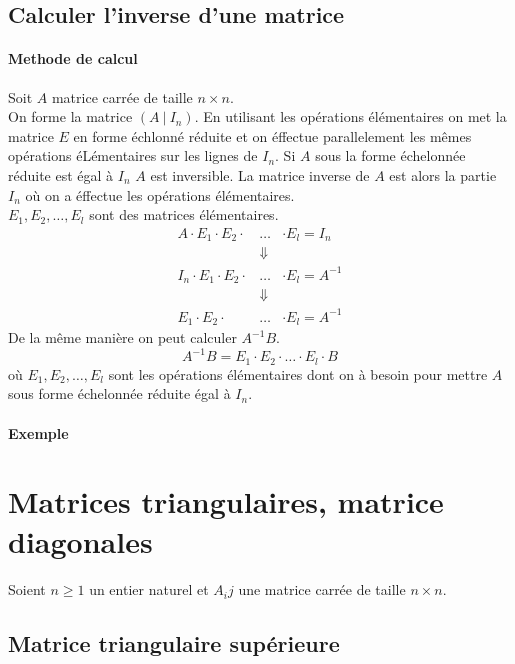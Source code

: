%
\subsection{Calculer l'inverse d'une matrice}
%
\paragraph{Methode de calcul} Soit $A$ matrice carrée de taille $n\times n$. \\
On forme la matrice $(A ~ \vert ~ I_n)$. En utilisant les opérations élémentaires on met la matrice $E$ en forme échlonné réduite et on éffectue parallelement les mêmes opérations éLémentaires sur les lignes de $I_n$. Si $A$ sous la forme échelonnée réduite est égal à $I_n$ $A$ est inversible. La matrice inverse de $A$ est alors la partie $I_n$ où on a éffectue les opérations élémentaires. \\
$E_1, E_2, \ldots, E_l$ sont des matrices élémentaires.
\begin{eqnarray*}
  A \cdot E_1 \cdot E_2 \cdot &\ldots& \cdot E_l = I_n \\
  &\Downarrow& \\
  I_n \cdot E_1 \cdot E_2 \cdot &\ldots& \cdot E_l = A^{-1} \\
  &\Downarrow& \\
  E_1 \cdot E_2 \cdot &\ldots& \cdot E_l = A^{-1}
\end{eqnarray*}
De la même manière on peut calculer $A^{-1} B$.
$$A^{-1} B = E_1 \cdot E_2 \cdot \ldots \cdot E_l \cdot B$$
où $E_1, E_2, \ldots, E_l$ sont les opérations élémentaires dont on à besoin pour mettre $A$ sous forme échelonnée réduite égal à $I_n$.

\paragraph{Exemple} %

%
%
\section{Matrices triangulaires, matrice diagonales}
%
%
\paragraph{} Soient $n \geq 1$ un entier naturel et $A_ij$ une matrice carrée de taille $n\times n$.

%
\subsection{Matrice triangulaire supérieure}
%
